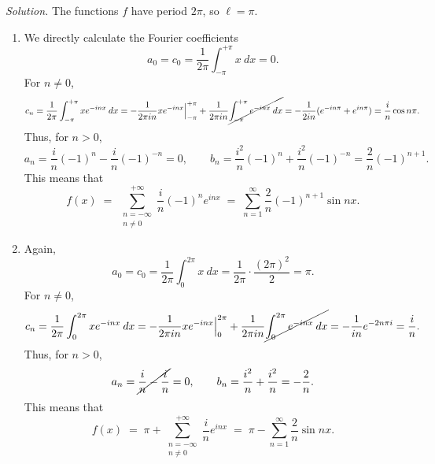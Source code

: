 \documentclass[10pt]{article}
\begin{document}
        \textit{Solution.}
        The functions $f$ have period $2\pi$, so $\ell = \pi$.
        \begin{enumerate}
                \item We directly calculate the Fourier coefficients
                \[
                        a_0 = c_0 = \frac{1}{2\pi}\int_{-\pi}^{+\pi} x\:dx = 0.
                \]
                For $n \neq 0$, 
                \[
                        c_n = \frac{1}{2\pi}\int_{-\pi}^{+\pi} xe^{-inx}\:dx = -\frac{1}{2\pi i n}xe^{-inx}\Big|_{-\pi}^{+\pi} +
                                \frac{1}{2\pi in}\cancel{\int_{-\pi}^{+\pi} e^{-inx}\:dx} = -\frac{1}{2in} (e^{-in\pi} + e^{in\pi}) 
                                        = \frac{i}{n}\cos{n\pi}.
                \]
                Thus, for $n > 0$,
                \[
                        a_n = \frac{i}{n}(-1)^n - \frac{i}{n}(-1)^{-n} = 0, \qquad b_n = \frac{i^2}{n}(-1)^{n} + \frac{i^2}{n}(-1)^{-n} 
                                = \frac{2}{n} (-1)^{n + 1}.
                \]
                This means that
                \[
                        f(x) \;=\; \sum_{\substack{n = -\infty \\ n \neq 0}}^{+\infty} \frac{i}{n}(-1)^n e^{inx} \;=\;
                                \sum_{n = 1}^\infty \frac{2}{n}(-1)^{n + 1}\sin{nx}. \tag{$\star$}
                \]
                
                \item Again,
                \[
                        a_0 = c_0 = \frac{1}{2\pi}\int_{0}^{2\pi} x\:dx = \frac{1}{2\pi}\cdot\frac{(2\pi)^2}{2} = \pi.
                \]
                For $n \neq 0$, 
                \[
                        c_n = \frac{1}{2\pi}\int_{0}^{2\pi} xe^{-inx}\:dx = -\frac{1}{2\pi i n}xe^{-inx}\Big|_{0}^{2\pi} +
                                \frac{1}{2\pi in}\cancel{\int_{0}^{2\pi} e^{-inx}\:dx} = -\frac{1}{in} e^{-2n\pi i}
                                        = \frac{i}{n}.
                \]
                Thus, for $n > 0$,
                \[
                        a_n = \cancel{\frac{i}{n} - \frac{i}{n}} = 0, \qquad b_n = \frac{i^2}{n} + \frac{i^2}{n} 
                                = -\frac{2}{n}.
                \]
                This means that
                \[
                        f(x) \;=\; \pi + \sum_{\substack{n = -\infty \\ n \neq 0}}^{+\infty} \frac{i}{n} e^{inx} \;=\;
                                \pi - \sum_{n = 1}^\infty \frac{2}{n}\sin{nx}. \tag{$\star$}
                \]
        \end{enumerate}
\end{document}
